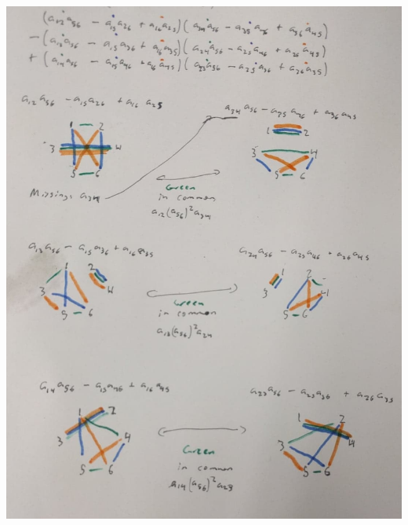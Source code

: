 \documentclass{article}
\begin{document}
\includegraphics[width=\textwidth]{MatchingsEnumerated}
\end{document}
